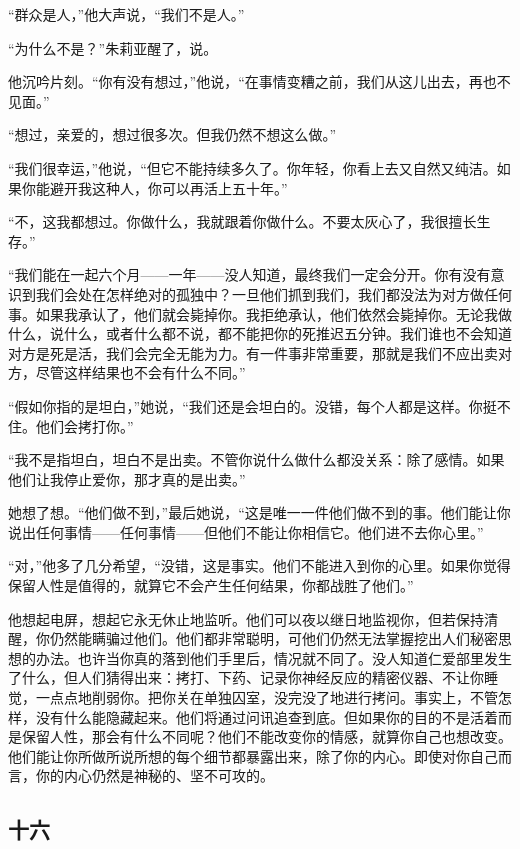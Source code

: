 ``群众是人，''他大声说，``我们不是人。''

``为什么不是？''朱莉亚醒了，说。

他沉吟片刻。``你有没有想过，''他说，``在事情变糟之前，我们从这儿出去，再也不见面。''

``想过，亲爱的，想过很多次。但我仍然不想这么做。''

``我们很幸运，''他说，``但它不能持续多久了。你年轻，你看上去又自然又纯洁。如果你能避开我这种人，你可以再活上五十年。''

``不，这我都想过。你做什么，我就跟着你做什么。不要太灰心了，我很擅长生存。''

``我们能在一起六个月------一年------没人知道，最终我们一定会分开。你有没有意识到我们会处在怎样绝对的孤独中？一旦他们抓到我们，我们都没法为对方做任何事。如果我承认了，他们就会毙掉你。我拒绝承认，他们依然会毙掉你。无论我做什么，说什么，或者什么都不说，都不能把你的死推迟五分钟。我们谁也不会知道对方是死是活，我们会完全无能为力。有一件事非常重要，那就是我们不应出卖对方，尽管这样结果也不会有什么不同。''

``假如你指的是坦白，''她说，``我们还是会坦白的。没错，每个人都是这样。你挺不住。他们会拷打你。''

``我不是指坦白，坦白不是出卖。不管你说什么做什么都没关系：除了感情。如果他们让我停止爱你，那才真的是出卖。''

她想了想。``他们做不到，''最后她说，``这是唯一一件他们做不到的事。他们能让你说出任何事情------任何事情------但他们不能让你相信它。他们进不去你心里。''

``对，''他多了几分希望，``没错，这是事实。他们不能进入到你的心里。如果你觉得保留人性是值得的，就算它不会产生任何结果，你都战胜了他们。''

他想起电屏，想起它永无休止地监听。他们可以夜以继日地监视你，但若保持清醒，你仍然能瞒骗过他们。他们都非常聪明，可他们仍然无法掌握挖出人们秘密思想的办法。也许当你真的落到他们手里后，情况就不同了。没人知道仁爱部里发生了什么，但人们猜得出来：拷打、下药、记录你神经反应的精密仪器、不让你睡觉，一点点地削弱你。把你关在单独囚室，没完没了地进行拷问。事实上，不管怎样，没有什么能隐藏起来。他们将通过问讯追查到底。但如果你的目的不是活着而是保留人性，那会有什么不同呢？他们不能改变你的情感，就算你自己也想改变。他们能让你所做所说所想的每个细节都暴露出来，除了你的内心。即使对你自己而言，你的内心仍然是神秘的、坚不可攻的。

\subsection{十六}\label{ux5341ux516d}

